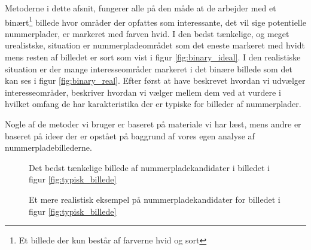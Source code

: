 Metoderne i dette afsnit, fungerer alle på den måde at de arbejder med et binært\footnote{Et billede der kun består af farverne hvid og sort} billede hvor områder der opfattes som interessante, det vil sige potentielle nummerplader, er markeret med farven hvid. I den bedst tænkelige, og meget urealistske, situation er nummerpladeområdet som det eneste markeret med hvidt mens resten af billedet er sort som vist i figur \vref{fig:binary_ideal}. I den realistiske situation er der mange interesseområder markeret i det binære billede som det kan ses i figur \vref{fig:binary_real}. Efter først at have beskrevet hvordan vi udvælger interesseområder, beskriver hvordan vi vælger mellem dem ved at vurdere i hvilket omfang de har karakteristika der er typiske for billeder af nummerplader. 

Nogle af de metoder vi bruger er baseret på materiale vi har læst, mens andre er baseret på ideer der er opstået på baggrund af vores egen analyse af nummerpladebillederne.


\begin{figure}[htbp]
  \centering
  \begin{minipage}[b]{5 cm}
    \caption{Det bedst tænkelige billede af nummerpladekandidater i billedet i figur \ref{fig:typisk_billede}}
    \label{fig:binary_ideal} 
  \end{minipage}
  \begin{minipage}[b]{5 cm}
  \caption{Et mere realistisk eksempel på nummerpladekandidater for billedet i figur \ref{fig:typisk_billede}}
  \label{fig:binary_real} 
  \end{minipage}
\end{figure}

